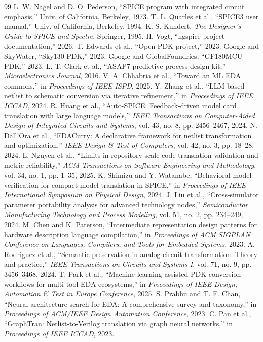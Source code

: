 \documentclass[10pt,twocolumn]{article}
\begin{document}
{\footnotesize
\begin{thebibliography}{99}
 L. W. Nagel and D. O. Pederson, ``SPICE program with integrated circuit emphasis,'' Univ. of California, Berkeley, 1973.
 T. L. Quarles et al., ``SPICE3 user manual,'' Univ. of California, Berkeley, 1994.
 K. S. Kundert, \emph{The Designer's Guide to SPICE and Spectre}. Springer, 1995.
 H. Vogt, ``ngspice project documentation,'' 2026.
 T. Edwards et al., ``Open PDK project,'' 2023.
 Google and SkyWater, ``Sky130 PDK,'' 2023.
 Google and GlobalFoundries, ``GF180MCU PDK,'' 2023.
 L. T. Clark et al., ``ASAP7 predictive process design kit,'' \emph{Microelectronics Journal}, 2016.
 V. A. Chhabria et al., ``Toward an ML EDA commons,'' in \emph{Proceedings of IEEE ISPD}, 2025.
 Y. Zhang et al., ``LLM-based netlist to schematic conversion via iterative refinement,'' in \emph{Proceedings of IEEE ICCAD}, 2024.
 R. Huang et al., ``Auto-SPICE: Feedback-driven model card translation with large language models,'' \emph{IEEE Transactions on Computer-Aided Design of Integrated Circuits and Systems}, vol. 43, no. 8, pp. 2456--2467, 2024.
 N. Dall'Ora et al., ``EDACurry: A declarative framework for netlist transformation and optimization,'' \emph{IEEE Design \& Test of Computers}, vol. 42, no. 3, pp. 18--28, 2024.
 L. Nguyen et al., ``Limits in repository scale code translation validation and metric reliability,'' \emph{ACM Transactions on Software Engineering and Methodology}, vol. 34, no. 1, pp. 1--35, 2025.
 K. Shimizu and Y. Watanabe, ``Behavioral model verification for compact model translation in SPICE,'' in \emph{Proceedings of IEEE International Symposium on Physical Design}, 2024.
 J. Liu et al., ``Cross-simulator parameter portability analysis for advanced technology nodes,'' \emph{Semiconductor Manufacturing Technology and Process Modeling}, vol. 51, no. 2, pp. 234--249, 2024.
 M. Chen and K. Paterson, ``Intermediate representation design patterns for hardware description language compilation,'' in \emph{Proceedings of ACM SIGPLAN Conference on Languages, Compilers, and Tools for Embedded Systems}, 2023.
 A. Rodriguez et al., ``Semantic preservation in analog circuit transformation: Theory and practice,'' \emph{IEEE Transactions on Circuits and Systems I}, vol. 71, no. 9, pp. 3456--3468, 2024.
 T. Park et al., ``Machine learning assisted PDK conversion workflows for multi-tool EDA ecosystems,'' in \emph{Proceedings of IEEE Design, Automation \& Test in Europe Conference}, 2025.
 S. Prabhu and T. F. Chan, ``Neural architecture search for EDA: A comprehensive survey and taxonomy,'' in \emph{Proceedings of ACM/IEEE Design Automation Conference}, 2023.
 C. Pan et al., ``GraphTran: Netlist-to-Verilog translation via graph neural networks,'' in \emph{Proceedings of IEEE ICCAD}, 2023.
\end{thebibliography}
}
\end{document}

